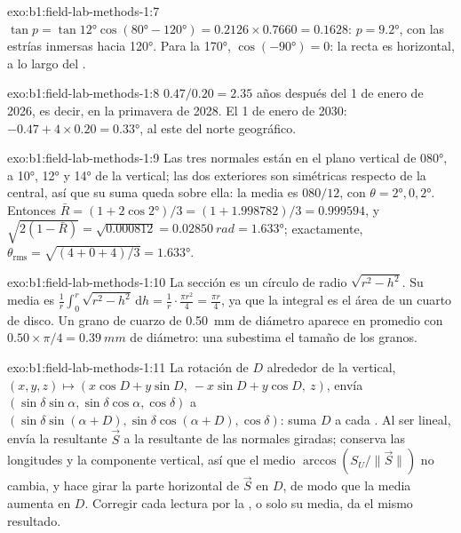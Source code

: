 \begin{solution}{exo:b1:field-lab-methods-1:7}
$\tan p = \tan\ang{12}\cos(\ang{80} - \ang{120}) = 0.2126\times0.7660 =
0.1628$: $p = \ang{9.2}$, con las estrías inmersas hacia \ang{120}. Para la  \ang{170},
$\cos(\ang{-90}) = 0$: la recta es horizontal, a lo largo del .
\end{solution}

\begin{solution}{exo:b1:field-lab-methods-1:8}
$0.47/0.20 = 2.35$ años después del 1 de enero de 2026, es decir, en la primavera de 2028. El 1 de enero
de 2030: $-0.47 + 4\times0.20 = \ang{+0.33}$, al este del norte geográfico.
\end{solution}

\begin{solution}{exo:b1:field-lab-methods-1:9}
Las tres normales están en el plano vertical de  \ang{080}, a \ang{10}, \ang{12} y \ang{14} de la
vertical; las dos exteriores son simétricas respecto de la central, así que su suma queda sobre ella: la
media es $080/12$, con $\theta = \ang{2}, 0, \ang{2}$. Entonces $\bar R = (1 +
2\cos\ang{2})/3 = (1 + 1.998782)/3 = 0.999594$, y $\sqrt{2(1 - \bar R)} =
\sqrt{0.000812} = \qty{0.02850}{rad} = \ang{1.633}$; exactamente,
$\theta_{\text{rms}} = \sqrt{(4 + 0 + 4)/3} = \ang{1.633}$.
\end{solution}

\begin{solution}{exo:b1:field-lab-methods-1:10}
La sección es un círculo de radio $\sqrt{r^2 - h^2}$. Su media es
$\frac1r\int_0^r\sqrt{r^2 - h^2}\,\mathrm dh = \frac1r\cdot\frac{\pi r^2}{4}
= \frac{\pi r}{4}$, ya que la integral es el área de un cuarto de disco. Un grano de cuarzo de
\qty{0.50}{mm} de diámetro aparece en promedio con $0.50\times\pi/4 = \qty{0.39}{mm}$ de diámetro: una
 subestima el tamaño de los granos.
\end{solution}

\begin{solution}{exo:b1:field-lab-methods-1:11}
La rotación de $D$ alrededor de la vertical,
$(x, y, z) \mapsto (x\cos D + y\sin D,\ -x\sin D + y\cos D,\ z)$, envía
$(\sin\delta\sin\alpha, \sin\delta\cos\alpha, \cos\delta)$ a
$(\sin\delta\sin(\alpha + D), \sin\delta\cos(\alpha + D), \cos\delta)$: suma $D$ a cada . Al ser lineal, envía la resultante $\vec S$ a la resultante de las normales giradas; conserva
las longitudes y la componente vertical, así que el  medio $\arccos(S_U/\|\vec S\|)$ no cambia,
y hace girar la parte horizontal de $\vec S$ en $D$, de modo que la  media aumenta en
$D$. Corregir cada lectura por la , o solo su media, da el mismo resultado.
\end{solution}

